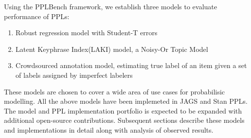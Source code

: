 \documentclass[main.tex]{subfiles}
\begin{document}
Using the PPLBench framework, we establish three models to evaluate performance of PPLs:
\begin{enumerate}
\item Robust regression model with Student-T errors\cite{gelman2013bayesian}
\item Latent Keyphrase Index(LAKI) model, a Noisy-Or Topic Model\cite{liu2016representing}
\item Crowdsourced annotation model, estimating true label of an item given a set of labels assigned by imperfect labelers\cite{passonneau2014benefits}
\end{enumerate}
These models are chosen to cover a wide area of use cases for probabilisic modelling.
All the above models have been implemeted in JAGS\cite{plummer2003jags} and Stan\cite{carpenter2017stan} PPLs.
The model and PPL implementation portfolio is expected to be expanded with additional open-source contributions.
Subsequent sections describe these models and implementations in detail along with analysis of observed results.
\end{document}
